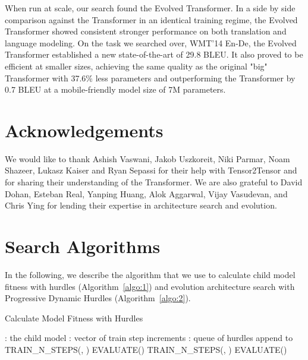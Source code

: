 \documentclass{article}
\begin{document}
When run at scale, our search found the Evolved Transformer. In a side by side comparison against the Transformer in an identical training regime, the Evolved Transformer showed consistent stronger performance on both translation and language modeling. On the task we searched over, WMT'14 En-De, the Evolved Transformer established a new state-of-the-art of 29.8 BLEU. It also proved to be efficient at smaller sizes, achieving the same quality as the original "big" Transformer with 37.6\% less parameters and outperforming the Transformer by 0.7 BLEU at a mobile-friendly model size of 7M parameters.

\clearpage

\section*{Acknowledgements}

We would like to thank Ashish Vaswani, Jakob Uszkoreit, Niki Parmar, Noam Shazeer, Lukasz Kaiser and Ryan Sepassi for their help with Tensor2Tensor and for sharing their understanding of the Transformer. We are also grateful to David Dohan, Esteban Real, Yanping Huang, Alok Aggarwal, Vijay Vasudevan, and Chris Ying for lending their expertise in architecture search and evolution.




\newpage
\appendix

\section{Search Algorithms}
In the following, we describe the algorithm that we use to calculate child model fitness with hurdles (Algorithm~\ref{algo:1}) and evolution architecture search with Progressive Dynamic Hurdles (Algorithm~\ref{algo:2}).
\begin{algorithm} [h!]
   \caption{Calculate Model Fitness with Hurdles}
   \label{algo:1}
\begin{algorithmic}
  \STATE\hspace{3pt} : the child model
  \STATE\hspace{3pt} : vector of train step increments
  \STATE\hspace{3pt} : queue of hurdles
  \STATE
  \STATE append  to 
  \STATE TRAIN\_N\_STEPS(, )
  \STATE  EVALUATE()
  \STATE 
  \STATE 
  \STATE
  \WHILE{}
  \STATE 
  \STATE TRAIN\_N\_STEPS(, )
  \STATE  EVALUATE()
  \STATE 
  \ENDWHILE
\end{algorithmic}
\end{algorithm}
\end{document}
